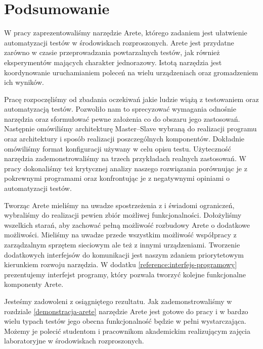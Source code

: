 \documentclass[00-praca-magisterska.tex]{subfiles}
\begin{document}
\chapter*{Podsumowanie}

W pracy zaprezentowaliśmy narzędzie Arete, którego zadaniem jest ułatwienie
automatyzacji testów w środowiskach rozproszonych. Arete jest przydatne zarówno
w czasie przeprowadzania powtarzalnych testów, jak również eksperymentów
mających charakter jednorazowy. Istotą narzędzia jest koordynowanie
uruchamianiem poleceń na wielu urządzeniach oraz gromadzeniem ich wyników.

Pracę rozpoczęliśmy od zbadania oczekiwań jakie ludzie wiążą z testowaniem oraz
automatyzacją testów. Pozwoliło nam to sprecyzować wymagania odnośnie narzędzia
oraz sformułować pewne założenia co do obszaru jego zastosowań.  Następnie
omówiliśmy architekturę Master--Slave wybraną do realizacji programu oraz
architektury i sposób realizacji poszczególnych komponentów. Dokładnie
omówiliśmy format konfiguracji używany w celu opisu testu. Użyteczność narzędzia
zademonstrowaliśmy na trzech przykładach realnych zastosowań. W pracy
dokonaliśmy też krytycznej analizy naszego rozwiązania porównując je z
pokrewnymi programami oraz konfrontując je z negatywnymi opiniami o
automatyzacji testów.

Tworząc Arete mieliśmy na uwadze spostrzeżenia z \cite{snake-oil} i
świadomi ograniczeń, wybraliśmy do realizacji pewien zbiór możliwej
funkcjonalności. Dołożyliśmy wszelkich starań, aby zachować pełną możliwość
rozbudowy Arete o dodatkowe możliwości. Mieliśmy na uwadze przede wszystkim
możliwość współpracy z zarządzalnym sprzętem sieciowym ale też z innymi
urządzeniami. Tworzenie dodatkowych interfejsów do komunikacji jest naszym
zdaniem priorytetowym kierunkiem rozwoju narzędzia. W dodatku \ref{reference:interfejs-programowy}
prezentujemy interfejst programy, który pozwala tworzyć kolejne funkcjonalne
komponenty Arete.

Jesteśmy zadowoleni z osiągniętego rezultatu. Jak zademonstrowaliśmy w
rozdziale \ref{demonstracja-arete} narzędzie Arete jest gotowe do pracy i w
bardzo wielu typach testów jego obecna funkcjonalność będzie w pełni
wystarczająca.  Możemy je polecić studentom i pracownikom akademickim
realizującym zajęcia laboratoryjne w środowiskach rozproszonych.
\end{document}
